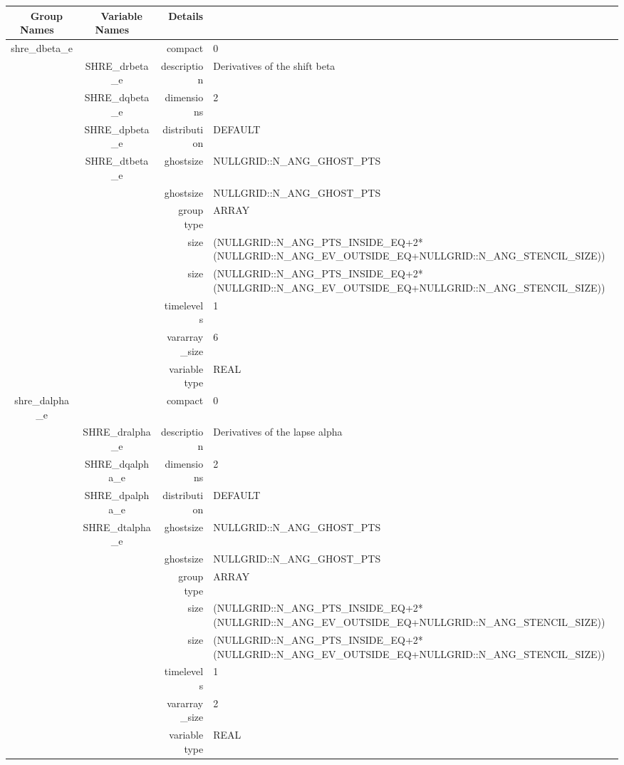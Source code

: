 \begin{tabular*}{150mm}{|c|c@{\extracolsep{\fill}}|rl|} \hline 
~ {\bf Group Names} ~ & ~ {\bf Variable Names} ~  &{\bf Details} ~ & ~ \\ 
\hline 
shre\_dbeta\_e &  & compact & 0 \\ 
 & SHRE\_drbeta\_e & description & Derivatives of the shift beta \\ 
 & SHRE\_dqbeta\_e & dimensions & 2 \\ 
 & SHRE\_dpbeta\_e & distribution & DEFAULT \\ 
 & SHRE\_dtbeta\_e & ghostsize & NULLGRID::N\_ANG\_GHOST\_PTS \\ 
& ~ & ghostsize & NULLGRID::N\_ANG\_GHOST\_PTS \\ 
 &  & group type & ARRAY \\ 
 &  & size & (NULLGRID::N\_ANG\_PTS\_INSIDE\_EQ+2*(NULLGRID::N\_ANG\_EV\_OUTSIDE\_EQ+NULLGRID::N\_ANG\_STENCIL\_SIZE)) \\ 
& ~ & size & (NULLGRID::N\_ANG\_PTS\_INSIDE\_EQ+2*(NULLGRID::N\_ANG\_EV\_OUTSIDE\_EQ+NULLGRID::N\_ANG\_STENCIL\_SIZE)) \\ 
 &  & timelevels & 1 \\ 
 &  & vararray\_size & 6 \\ 
 &  & variable type & REAL \\ 
\hline 
shre\_dalpha\_e &  & compact & 0 \\ 
 & SHRE\_dralpha\_e & description & Derivatives of the lapse alpha \\ 
 & SHRE\_dqalpha\_e & dimensions & 2 \\ 
 & SHRE\_dpalpha\_e & distribution & DEFAULT \\ 
 & SHRE\_dtalpha\_e & ghostsize & NULLGRID::N\_ANG\_GHOST\_PTS \\ 
& ~ & ghostsize & NULLGRID::N\_ANG\_GHOST\_PTS \\ 
 &  & group type & ARRAY \\ 
 &  & size & (NULLGRID::N\_ANG\_PTS\_INSIDE\_EQ+2*(NULLGRID::N\_ANG\_EV\_OUTSIDE\_EQ+NULLGRID::N\_ANG\_STENCIL\_SIZE)) \\ 
& ~ & size & (NULLGRID::N\_ANG\_PTS\_INSIDE\_EQ+2*(NULLGRID::N\_ANG\_EV\_OUTSIDE\_EQ+NULLGRID::N\_ANG\_STENCIL\_SIZE)) \\ 
 &  & timelevels & 1 \\ 
 &  & vararray\_size & 2 \\ 
 &  & variable type & REAL \\ 
\hline 
\end{tabular*} 




